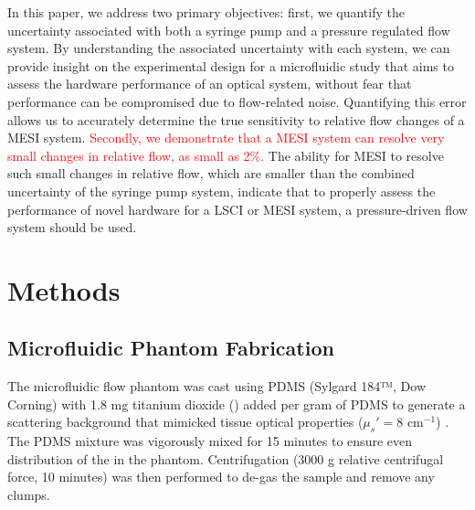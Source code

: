 \documentclass[12pt]{spieman}
\begin{document}
\begin{spacing}{2}
In this paper, we address two primary objectives: first, we quantify the uncertainty associated with both a syringe pump and a pressure regulated flow system. By understanding the associated uncertainty with each system, we can provide insight on the experimental design for a microfluidic study that aims to assess the hardware performance of an optical system, without fear that performance can be compromised due to flow-related noise. Quantifying this error allows us to accurately determine the true sensitivity to relative flow changes of a MESI system. \textcolor{red}{Secondly, we demonstrate that a MESI system can resolve very small changes in relative flow, as small as 2\%.} The ability for MESI to resolve such small changes in relative flow, which are smaller than the combined uncertainty of the syringe pump system, indicate that to properly assess the performance of novel hardware for a LSCI or MESI system, a pressure-driven flow system should be used.


\section{Methods}
\label{sect:methods}

\subsection{Microfluidic Phantom Fabrication}
\label{sect:methods_phantom}
The microfluidic flow phantom was cast using PDMS (Sylgard 184™, Dow Corning) with 1.8 mg titanium dioxide () added per gram of PDMS to generate a scattering background that mimicked tissue optical properties ($\mu_s' = 8$ cm$^{-1}$) \cite{Parthasarathy:2008el,Yaroslavsky:2002tg}. The PDMS  mixture was vigorously mixed for 15 minutes to ensure even distribution of the  in the phantom. Centrifugation (3000 g relative centrifugal force, 10 minutes) was then performed to de-gas the sample and remove any  clumps.


\end{spacing}
\end{document}
